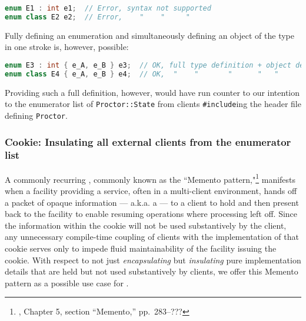 \begin{lstlisting}[language=C++]
enum E1 : int e1;  // Error, syntax not supported
enum class E2 e2;  // Error,    "    "     "
\end{lstlisting}

\noindent Fully defining an enumeration and simultaneously defining an object of
the type in one stroke is, however, possible:

\begin{lstlisting}[language=C++]
enum E3 : int { e_A, e_B } e3;  // OK, full type definition + object definition
enum class E4 { e_A, e_B } e4;  // OK,  "    "       "      "   "        "
\end{lstlisting}

\noindent Providing such a full definition, however, would have run counter to our
intention to  the enumerator list of
\lstinline!Proctor::State! from clients \lstinline!#include!ing the header
file defining \lstinline!Proctor!.

\subsubsection[Cookie: Insulating all external clients from the enumerator list]{Cookie: Insulating all external clients from the enumerator list}\label{cookie:-insulating-all-external-clients-from-the-enumerator-list}

A commonly recurring , commonly known as the
``Memento pattern,"\footnote{\cite{gamma95}, Chapter 5, section ``Memento,'' pp.~283--???} manifests when a facility providing a service, often in a
multi-client environment, hands off a packet of opaque information ---
a.k.a. a  --- to a client to hold and then present back to
the facility to enable resuming operations where processing left off.
Since the information within the cookie will not be used substantively
by the client, any unnecessary compile-time coupling of clients with the
implementation of that cookie serves only to impede fluid
maintainability of the facility issuing the cookie. With respect
to not just \emph{encapsulating} but \emph{insulating} pure
implementation details that are held but not used substantively by
clients, we offer this Memento pattern as a possible use case
for .

